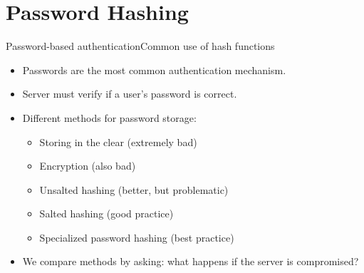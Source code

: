 \documentclass[aspectratio=169, lualatex, handout]{beamer}
\begin{document}
\iffalse
	\begin{frame}{Multi-Collision Attacks}
		\definitionbox{Multi-Collision}{
			A \textbf{multi-collision} is a set of $k$ distinct inputs that all hash to the same output value.
		}
		\begin{itemize}
			\item Joux's 2004 multi-collision attack:
			      \begin{itemize}
				      \item Finding $2^n$ colliding messages requires only about $n$ times the work of finding a single collision.
				      \item For a 128-bit hash, finding $2^{64}$ collisions takes only about 64 times more work than finding one collision.
				      \item Much more efficient than expected from the birthday paradox!
			      \end{itemize}
			\item Implications:
			      \begin{itemize}
				      \item Concatenating two hash functions ($H_1 \| H_2$) provides much less security than expected.
				      \item Influences modern hash function design.
			      \end{itemize}
		\end{itemize}
	\end{frame}
\fi

\section{Password Hashing}

\begin{frame}{Password-based authentication}{Common use of hash functions}
	\begin{itemize}
		\item Passwords are the most common authentication mechanism.
		\item Server must verify if a user's password is correct.
		\item Different methods for password storage:
		      \begin{itemize}
			      \item<1-5> Storing in the clear (extremely bad)
			      \item<2-5> Encryption (also bad)
			      \item<3-5> Unsalted hashing (better, but problematic)
			      \item<4-5> Salted hashing (good practice)
			      \item<5-5> Specialized password hashing (best practice)
		      \end{itemize}
		\item We compare methods by asking: what happens if the server is compromised?
	\end{itemize}
\end{frame}
\end{document}

